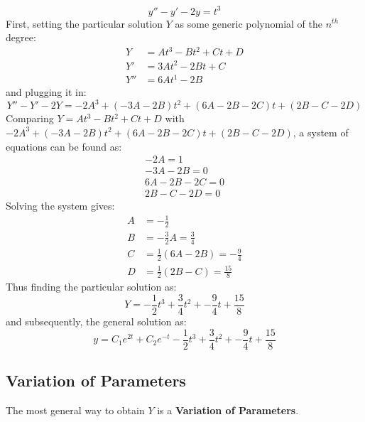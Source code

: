 \documentclass[12pt]{article}
\begin{document}
\begin{example}
  \begin{equation*}
    y'' - y' - 2y = t^3
  \end{equation*}
  First, setting the particular solution $Y$ as some generic polynomial of the $n^{th}$ degree:
  \begin{align*}
    Y &= At^3 - Bt^2 + Ct + D \\
    Y' &= 3At^2 - 2Bt + C \\
    Y'' &= 6At^1 - 2B
  \end{align*}
  and plugging it in:
  \begin{equation*}
    Y'' - Y' - 2Y = -2A^3 + \left(-3A-2B\right)t^2 + (6A-2B-2C)t + (2B-C-2D)
  \end{equation*}
  Comparing $Y = At^3 - Bt^2 + Ct + D$ with $-2A^3 + \left(-3A-2B\right)t^2 + (6A-2B-2C)t + (2B-C-2D)$, a system of equations can be found as:
  \begin{gather*}
    -2A = 1 \\
    -3A-2B = 0 \\
    6A - 2B - 2C = 0 \\
    2B - C - 2D = 0
  \end{gather*}
  Solving the system gives:
  \begin{align*}
    A &= - \frac{1}{2} \\
    B &= - \frac{3}{2}A = \frac{3}{4} \\
    C &= \frac{1}{2}(6A-2B) = -\frac{9}{4} \\
    D &= \frac{1}{2}(2B-C) = \frac{15}{8}
  \end{align*}
  Thus finding the particular solution as:
  \begin{equation*}
    Y = - \frac{1}{2}t^3 + \frac{3}{4}t^2 + -\frac{9}{4}t + \frac{15}{8}
  \end{equation*}
  and subsequently, the general solution as:
  \begin{equation*}
    y = C_1e^{2t} + C_2e^{-t} - \frac{1}{2}t^3 + \frac{3}{4}t^2 + -\frac{9}{4}t + \frac{15}{8}
  \end{equation*}
\end{example}

\subsection{Variation of Parameters}
\label{ssec:variationOfParameters}

The most general way to obtain $Y$ is a \textbf{Variation of Parameters}.
\end{document}
